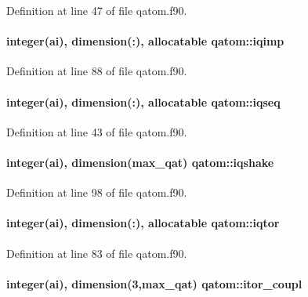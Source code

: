 Definition at line 47 of file qatom.\-f90.

\hypertarget{classqatom_acf0713070153169232f5dc042a5b41fa}{
\paragraph[{iqimp}]{\setlength{\rightskip}{0pt plus 5cm}integer(ai), dimension(\-:), allocatable qatom\-::iqimp}}\label{classqatom_acf0713070153169232f5dc042a5b41fa}


Definition at line 88 of file qatom.\-f90.

\hypertarget{classqatom_abb14d4ee8a5fb947e6552af656fbe0e7}{
\paragraph[{iqseq}]{\setlength{\rightskip}{0pt plus 5cm}integer(ai), dimension(\-:), allocatable qatom\-::iqseq}}\label{classqatom_abb14d4ee8a5fb947e6552af656fbe0e7}


Definition at line 43 of file qatom.\-f90.

\hypertarget{classqatom_a45d0fea31b19ee37b386b811bb6ebfc7}{
\paragraph[{iqshake}]{\setlength{\rightskip}{0pt plus 5cm}integer(ai), dimension({\bf max\-\_\-qat}) qatom\-::iqshake}}\label{classqatom_a45d0fea31b19ee37b386b811bb6ebfc7}


Definition at line 98 of file qatom.\-f90.

\hypertarget{classqatom_ae7a6c8483c92e6ee4a12477a427bb9f9}{
\paragraph[{iqtor}]{\setlength{\rightskip}{0pt plus 5cm}integer(ai), dimension(\-:), allocatable qatom\-::iqtor}}\label{classqatom_ae7a6c8483c92e6ee4a12477a427bb9f9}


Definition at line 83 of file qatom.\-f90.

\hypertarget{classqatom_a155b1e58a34b7c1d1757b9db290dd60b}{
\paragraph[{itor\-\_\-coupl}]{\setlength{\rightskip}{0pt plus 5cm}integer(ai), dimension(3,{\bf max\-\_\-qat}) qatom\-::itor\-\_\-coupl}}\label{classqatom_a155b1e58a34b7c1d1757b9db290dd60b}


